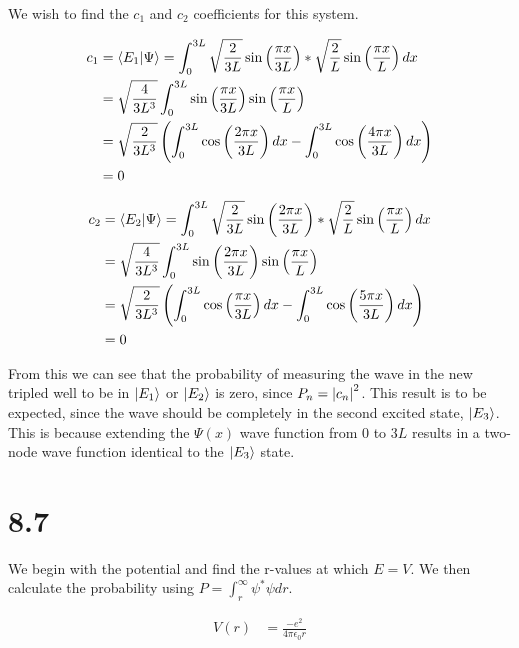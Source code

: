 \documentclass[10pt]{article} %
\begin{document}
We wish to find the $c_1$ and $c_2$ coefficients for this system.

\begin{align*}
  c_1 &= \braket{E_1}{\Psi} = \int_0^{3L} \sqrt{\frac{2}{3L}}\sin\left(\frac{\pi x}{3L}\right)*
  \sqrt{\frac{2}{L}}\sin\left(\frac{\pi x}{L}\right)dx\\
  &= \sqrt{\frac{4}{3L^3}}\int_0^{3L}
  \sin\left(\frac{\pi x}{3L}\right)\sin\left(\frac{\pi x}{L}\right)\\
  &= \sqrt{\frac{2}{3L^3}}\left(\int_0^{3L} \cos\left(\frac{2\pi x}{3L}\right)dx
  - \int_0^{3L} \cos\left(\frac{4\pi x}{3L}\right)dx\right)\\
  &= 0\\
\end{align*}

\begin{align*}
  c_2 &= \braket{E_2}{\Psi} = \int_0^{3L} \sqrt{\frac{2}{3L}}\sin\left(\frac{2\pi x}{3L}\right)*
  \sqrt{\frac{2}{L}}\sin\left(\frac{\pi x}{L}\right)dx\\
  &= \sqrt{\frac{4}{3L^3}}\int_0^{3L}
  \sin\left(\frac{2\pi x}{3L}\right)\sin\left(\frac{\pi x}{L}\right)\\
  &= \sqrt{\frac{2}{3L^3}}\left(\int_0^{3L} \cos\left(\frac{\pi x}{3L}\right)dx
  - \int_0^{3L} \cos\left(\frac{5\pi x}{3L}\right)dx\right)\\
  &= 0\\
\end{align*}

From this we can see that the probability of measuring the wave in the new tripled well to be in
$\ket{E_1}$ or $\ket{E_2}$ is zero, since $P_n = \abs{c_n}^2$. This result is to be expected, since
the wave should be completely in the second excited state, $\ket{E_3}$. This is because extending
the $\Psi(x)$ wave function from $0$ to $3L$ results in a two-node wave function identical to the
$\ket{E_3}$ state.\\

\section{8.7}
We begin with the potential and find the r-values at which $E=V$. We then calculate
the probability using $P = \int_r^\infty \psi^* \psi dr$.

\begin{align*}
  V(r) &= \frac{-e^2}{4\pi\epsilon_0r}\\
\end{align*}
\end{document}
